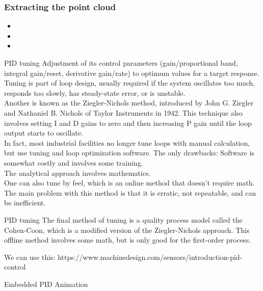 \documentclass{beamer}
\begin{document}
\begin{frame}\frametitle{Extracting the point cloud}



\begin{itemize}
	\item 
	\item  
	\item 
\end{itemize}


\end{frame}

\begin{frame}{PID tuning}
Adjustment of its control parameters (gain/proportional band, integral gain/reset, derivative gain/rate) to optimum values for a target response. Tuning is part of loop design, usually required if the system oscillates too much, responds too slowly, has steady-state error, or is unstable.\\
Another is known as the Ziegler-Nichols method, introduced by John G. Ziegler and Nathaniel B. Nichols of Taylor Instruments in 1942. This technique also involves setting I and D gains to zero and then increasing P gain until the loop output starts to oscillate. \\
In fact, most industrial facilities no longer tune loops with manual calculation, but use tuning and loop optimization software.  The only drawbacks: Software is somewhat costly and involves some training.\\
The analytical approach involves mathematics. \\
One can also tune by feel, which is an online method that doesn't require math. The main problem with this method is that it is erratic, not repeatable, and can be inefficient.\\
\end{frame}


\begin{frame}{PID tuning}
The final method of tuning is a quality process model called the Cohen-Coon, which is a modified version of the Ziegler-Nichols approach. This offline method involves some math, but is only good for the first-order process.

We can use this:
https://www.machinedesign.com/sensors/introduction-pid-control


\end{frame}



\begin{frame}{Embedded PID Animation}
\end{frame}
\end{document}
